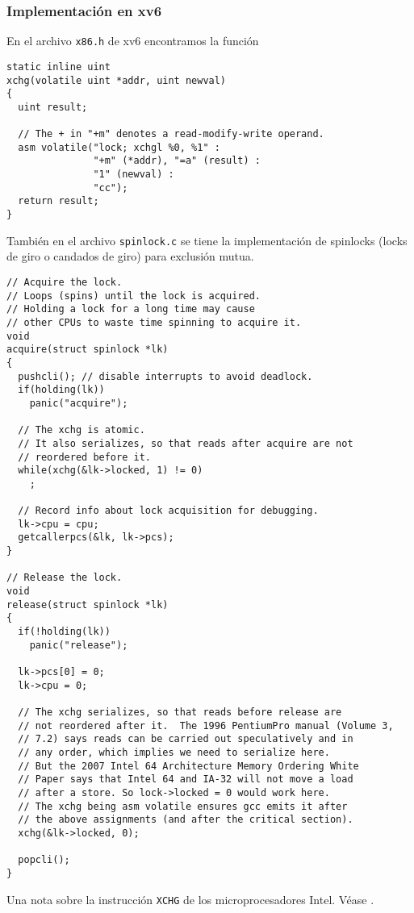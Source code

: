 \documentclass{article}
\begin{document}
\subsubsection*{Implementaci\'on en xv6}
En el archivo {\tt x86.h} de xv6 encontramos la funci\'on
\begin{verbatim}
static inline uint
xchg(volatile uint *addr, uint newval)
{
  uint result;
  
  // The + in "+m" denotes a read-modify-write operand.
  asm volatile("lock; xchgl %0, %1" :
               "+m" (*addr), "=a" (result) :
               "1" (newval) :
               "cc");
  return result;
}
\end{verbatim}
Tambi\'en en el archivo {\tt spinlock.c} se tiene la implementaci\'on 
de spinlocks (locks de giro o candados de giro) para exclusi\'on mutua.
\begin{verbatim}
// Acquire the lock.
// Loops (spins) until the lock is acquired.
// Holding a lock for a long time may cause
// other CPUs to waste time spinning to acquire it.
void
acquire(struct spinlock *lk)
{
  pushcli(); // disable interrupts to avoid deadlock.
  if(holding(lk))
    panic("acquire");

  // The xchg is atomic.
  // It also serializes, so that reads after acquire are not
  // reordered before it. 
  while(xchg(&lk->locked, 1) != 0)
    ;

  // Record info about lock acquisition for debugging.
  lk->cpu = cpu;
  getcallerpcs(&lk, lk->pcs);
}

// Release the lock.
void
release(struct spinlock *lk)
{
  if(!holding(lk))
    panic("release");

  lk->pcs[0] = 0;
  lk->cpu = 0;

  // The xchg serializes, so that reads before release are 
  // not reordered after it.  The 1996 PentiumPro manual (Volume 3,
  // 7.2) says reads can be carried out speculatively and in
  // any order, which implies we need to serialize here.
  // But the 2007 Intel 64 Architecture Memory Ordering White
  // Paper says that Intel 64 and IA-32 will not move a load
  // after a store. So lock->locked = 0 would work here.
  // The xchg being asm volatile ensures gcc emits it after
  // the above assignments (and after the critical section).
  xchg(&lk->locked, 0);

  popcli();
}
\end{verbatim}
Una nota sobre la instrucci\'on {\tt XCHG} de los microprocesadores 
Intel. V\'ease \cite{Brey}.\par
\end{document}
